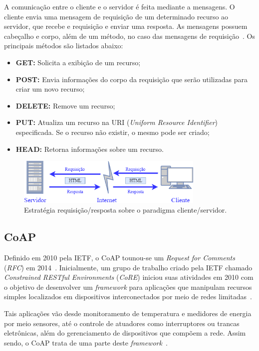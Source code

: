 A comunicação entre o cliente e o servidor é feita mediante a  mensagens. O cliente envia uma mensagem de requisição de um determinado recurso ao servidor, que recebe e requisição e enviar uma resposta. As mensagens possuem cabeçalho e corpo, além de um método, no caso das mensagens de requisição~\cite{fielding2014hypertext}. Os principais métodos são listados abaixo:
\begin{itemize}
    \item \textbf{GET:} Solicita a exibição de um recurso;
    \item \textbf{POST:} Envia informações do corpo da requisição que serão utilizadas para criar um novo recurso;
    \item \textbf{DELETE:} Remove um recurso;
    \item \textbf{PUT:} Atualiza um recurso na URI (\textit{Uniform Resource Identifier}) especificada. Se o recurso não existir, o mesmo pode ser criado;
    \item \textbf{HEAD:} Retorna informações sobre um recurso.
\end{itemize}

\begin{figure}[ht]
\centering
\includegraphics[width=0.8\textwidth]{imagens/cliente_servidor.png}
\caption{Estratégia requisição/resposta sobre o paradigma cliente/servidor.
\label{fig:req/res}}
\end{figure}
\FloatBarrier

\subsection{CoAP}\label{sec:coap}

Definido em 2010 pela IETF, o CoAP tounou-se um \textit{Request for Comments} (\textit{RFC}) em 2014~\cite{shelby2014constrained}. Inicialmente, um grupo de trabalho criado pela IETF chamado \textit{Constrained RESTful Environments} (\textit{CoRE}) iniciou suas atividades em 2010 com o objetivo de desenvolver um \textit{framework} para aplicações que manipulam recursos simples localizados em dispositivos interconectados por meio de redes limitadas~\cite{shelby2014constrained}. 

Tais aplicações vão desde monitoramento de temperatura e medidores de energia por meio sensores, até o controle de atuadores como interruptores ou trancas eletrônicas, além do gerenciamento de dispositivos que compõem a rede. Assim sendo, o CoAP trata de uma parte deste \textit{framework}~\cite{shelby2014constrained}.

